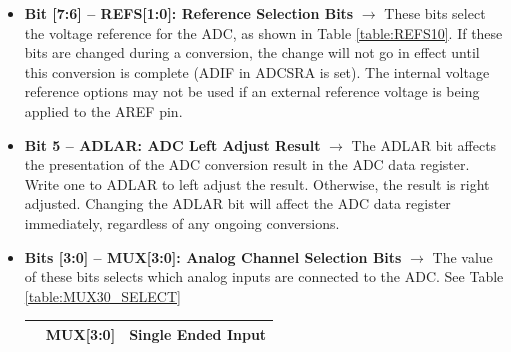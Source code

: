 \begin{itemize}
    \item \textbf{Bit [7:6] – REFS[1:0]: Reference Selection Bits} $\bm{\rightarrow}$ These bits select the voltage reference for the ADC, as shown in Table \ref{table:REFS10}. If these bits are changed during a conversion, the change will not go in effect until this conversion is complete (ADIF in ADCSRA is set). The internal voltage reference options may not be used if an external reference voltage is being applied to the AREF pin.
    
    \begin{table}[H]
    \end{table}

    \item \textbf{Bit 5 – ADLAR: ADC Left Adjust Result} $\bm{\rightarrow}$ The ADLAR bit affects the presentation of the ADC conversion result in the ADC data register. Write one to ADLAR to left adjust the result. Otherwise, the result is right adjusted. Changing the ADLAR bit will affect the ADC data register immediately, regardless of any ongoing conversions.
    
    \item \textbf{Bits [3:0] – MUX[3:0]: Analog Channel Selection Bits} $\bm{\rightarrow}$ The value of these bits selects which analog inputs are connected to the ADC. See Table \ref{table:MUX30_SELECT}
    
    \begin{table}[H]
        \centering
        \begin{tabular}[t]{lcc}
            \toprule
            & \textbf{MUX[3:0]} & \textbf{Single Ended Input} \\
            \midrule


\end{tabular}
\end{table}
\end{itemize}
